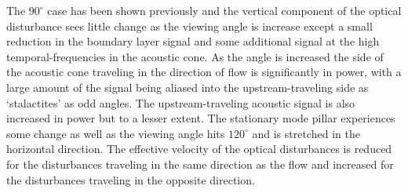 The $90^\circ$ case has been shown previously and the vertical component of the optical  disturbance sees little change as the viewing angle is increase except a small reduction in the boundary layer signal and some additional signal at the high temporal-frequencies in the acoustic cone.
As the angle is increased the side of the acoustic cone traveling in the direction of flow is significantly in power, with a large amount of the signal being aliased into the upstream-traveling side as `stalactites' as odd angles.
The upstream-traveling acoustic signal is also increased in power but to a lesser extent.
The stationary mode pillar experiences some change as well as the viewing angle hits $120^\circ$ and is stretched in the horizontal direction.
The effective velocity of the optical disturbances is reduced for the disturbances traveling in the same direction as the flow and increased for the disturbances traveling in the opposite direction.


